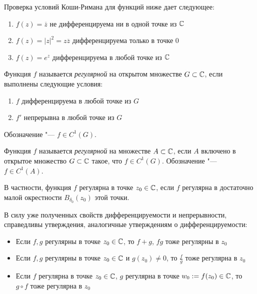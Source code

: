 \begin{example}
	Проверка условий Коши-Римана для функций ниже дает следующее:
	\begin{enumerate}
		\item $f(z) =\overline{z}$ не дифференцируема ни в одной точке из $\mathbb{C}$
		\item $f(z) = |z|^2 = z\overline{z}$ дифференцируема только в точке $0$
		\item $f(z) = e^z$ дифференцируема в любой точке из $\mathbb{C}$
	\end{enumerate}
\end{example}

\begin{definition}
	Функция $f$ называется \textit{регулярной} на открытом множестве $G \subset \mathbb{C}$, если выполнены следующие условия:
	\begin{enumerate}
		\item $f$ дифференцируема в любой точке из $G$
		\item $f'$ непрерывна в любой точке из $G$
	\end{enumerate}

	Обозначение "--- $f \in C^1(G)$.
\end{definition}

\begin{definition}
	Функция $f$ называется \textit{регулярной} на множестве $A \subset \mathbb{C}$, если $A$ включено в открытое множество $G \subset \mathbb{C}$ такое, что $f \in C^1(G)$. Обозначение "--- $f \in C^1(A)$.
\end{definition}

\begin{note}
	В частности, функция $f$ регулярна в точке $z_0 \in \mathbb{C}$, если $f$ регулярна в достаточно малой окрестности $B_{\delta_0}(z_0)$ этой точки.
\end{note}

\begin{note}
	В силу уже полученных свойств дифференцируемости и непрерывности, справедливы утверждения, аналогичные утверждениям о дифференцируемости:
	\begin{itemize}
		\item Если $f, g$ регулярны в точке $z_0 \in \mathbb{C}$, то $f + g$, $fg$ тоже регулярны в $z_0$
		\item Если $f, g$ регулярны в точке $z_0 \in \mathbb{C}$ и $g(z_0) \ne 0$, то $\frac fg$ тоже регулярна в $z_0$
		\item Если $f$ регулярна в точке $z_0 \in \mathbb{C}$, $g$ регулярна в точке $w_0 := f(z_0) \in \mathbb{C}$, то $g \circ f$ тоже регулярна в $z_0$
	\end{itemize}
\end{note}


